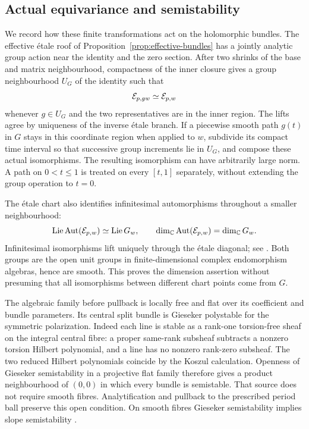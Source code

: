 \subsection{Actual equivariance and semistability}

We record how these finite transformations act on the
holomorphic bundles. The effective étale roof of
Proposition~\ref{prop:effective-bundles} has a jointly
analytic group action near the identity and the zero
section. After two shrinks of the base and matrix
neighbourhood, compactness of the inner closure gives
a group neighbourhood $U_G$ of the identity such that
\begin{equation}\label{eq:local-actual-equivariance}
             \mathcal E_{p,gw}\simeq\mathcal E_{p,w}
\end{equation}
whenever $g\in U_G$ and the two representatives are in
the inner region. The lifts agree by uniqueness of the
inverse étale branch. If a piecewise smooth path $g(t)$
in $G$ stays in this coordinate region when applied to
$w$, subdivide its compact time interval so that successive
group increments lie in $U_G$, and compose these actual
isomorphisms. The resulting isomorphism can have arbitrarily
large norm. A path on $0<t\le1$ is treated on every
$[t,1]$ separately, without extending the group operation
to $t=0$.

The étale chart also identifies infinitesimal
automorphisms throughout a smaller neighbourhood:
\begin{equation}\label{eq:automorphism-dimensions}
 \operatorname{Lie}\operatorname{Aut}(\mathcal E_{p,w})
             \simeq\operatorname{Lie}G_w,
 \qquad\dim_\mathbb C\operatorname{Aut}(\mathcal E_{p,w})=\dim_\mathbb C G_w.
\end{equation}
Infinitesimal isomorphisms lift uniquely through the
étale diagonal; see \cite[Tag 0CJ1]{Stacks}.
Both groups are the open unit groups in finite-dimensional
complex endomorphism algebras, hence are smooth.
This proves the dimension assertion without presuming
that all isomorphisms between different chart points
come from $G$.

The algebraic family before pullback is locally free
and flat over its coefficient and bundle parameters.
Its central split bundle is Gieseker polystable for the
symmetric polarization. Indeed each line is stable as
a rank-one torsion-free sheaf on the integral central
fibre: a proper same-rank subsheaf subtracts a nonzero
torsion Hilbert polynomial, and a line has no nonzero
rank-zero subsheaf. The two reduced Hilbert polynomials
coincide by the Koszul calculation. Openness of Gieseker
semistability in a projective flat family
\cite[Proposition 2.3.1]{HL} therefore gives a product
neighbourhood of $(0,0)$ in which every bundle is
semistable. That source does not require smooth fibres.
Analytification and pullback to the prescribed period
ball preserve this open condition. On smooth fibres
Gieseker semistability implies slope semistability
\cite[Lemma 1.2.13]{HL}.

